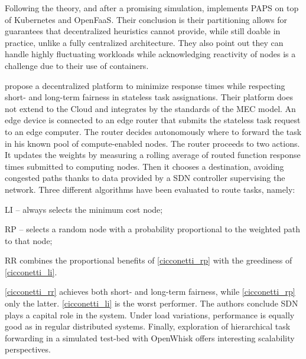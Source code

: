 \documentclass[11pt]{sdm}
\begin{document}
\begin{description}[leftmargin=10pt]
		Following the theory, and after a promising simulation, \citet{baresi_paps_2021} implements \gls{PAPS} on top of Kubernetes and OpenFaaS. Their conclusion is their partitioning allows for guarantees that decentralized heuristics cannot provide, while still doable in practice, unlike a fully centralized architecture. They also point out they can handle highly fluctuating workloads while acknowledging reactivity of nodes is a challenge due to their use of containers.

	\item[\citet{cicconetti_decentralized_2021}] propose a decentralized platform to minimize response times while respecting short- and long-term fairness in stateless task assignations. Their platform does not extend to the Cloud and integrates by the standards of the \gls{MEC} model. An edge device is connected to an edge router that submits the stateless task request to an edge computer. The router decides autonomously where to forward the task in his known pool of compute-enabled nodes. The router proceeds to two actions. It updates the weights by measuring a rolling average of routed function response times submitted to computing nodes. Then it chooses a destination, avoiding congested paths thanks to data provided by a \gls{SDN} controller supervising the network. Three different algorithms have been evaluated to route tasks, namely:
		\begin{enumerate*}[(i)]
			\item \label{cicconetti_li} \gls{LI} -- always selects the minimum cost node;
			\item \label{cicconetti_rp} \gls{RP} -- selects a random node with a probability proportional to the weighted path to that node;
			\item \label{cicconetti_rr} \gls{RR} combines the proportional benefits of \cref{cicconetti_rp} with the greediness of \cref{cicconetti_li}.
		\end{enumerate*}
		\cref{cicconetti_rr} achieves both short- and long-term fairness, while \cref{cicconetti_rp} only the latter. \cref{cicconetti_li} is the worst performer.
		The authors conclude \gls{SDN} plays a capital role in the system. Under load variations, performance is equally good as in regular distributed systems. Finally, exploration of hierarchical task forwarding in a simulated test-bed with OpenWhisk offers interesting scalability perspectives.


\end{description}
\end{document}
